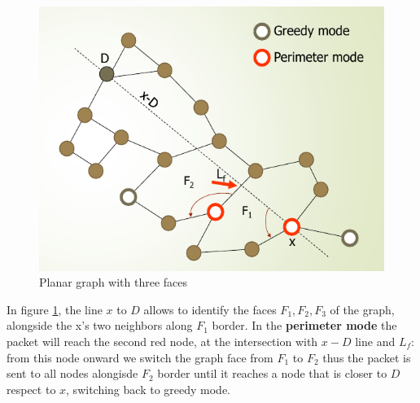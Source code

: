 \documentclass[10pt,a4paper]{report}
\theoremstyle{definition}
\begin{document}
\begin{figure}[h]
	\centering
	\includegraphics[scale=0.50]{images/Pasted image 20230523155042.png}	
	\caption{Planar graph with three faces}
	\label{planar-graph-faces}
	
\end{figure}

In figure \ref{planar-graph-faces}, the line $x$ to $D$ allows to identify the faces $F_{1}, F_{2}, F_{3}$ of the graph, alongside the x's two neighbors along $F_{1}$ border.
In the \textbf{perimeter mode} the packet will reach the second red node, at the intersection with $x-D$ line and $L_{f}$: from this node onward we switch the graph face from $F_{1}$ to $F_{2}$ thus the packet is sent to all nodes alongisde $F_{2}$ border until it reaches a node that is closer to $D$ respect to $x$, switching back to greedy mode.\\
\end{document}
